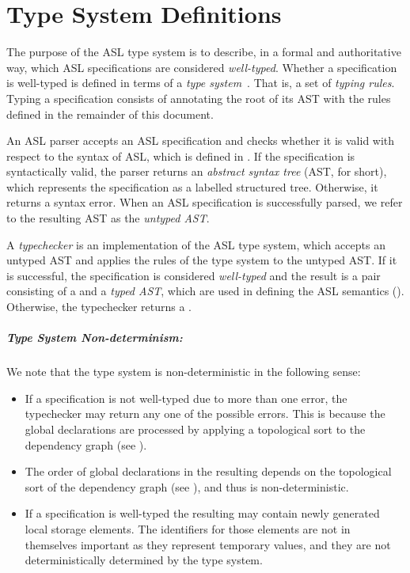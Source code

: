 \chapter{Type System Definitions\label{chap:TypeChecking}}

The purpose of the ASL type system is to describe, in a formal and authoritative way,
which ASL specifications are considered \emph{well-typed}.
Whether a specification is well-typed is defined in terms of a \emph{type system}~\cite{TypeSystemsLucaCardelli}.
That is, a set of \emph{typing rules}.
Typing a specification consists of annotating the root of its AST with the rules defined
in the remainder of this document.

An ASL parser accepts an ASL specification and checks whether it is valid with respect to the syntax of ASL,
which is defined in .
If the specification is syntactically valid, the parser returns an \emph{abstract syntax tree} (AST, for short),
which represents the specification as a labelled structured tree. Otherwise, it returns a syntax error.
When an ASL specification is successfully parsed, we refer to the resulting AST as the \emph{untyped AST}.

A \emph{typechecker} is an implementation of the ASL type system, which accepts an untyped AST and applies the
rules of the type system to the untyped AST. If it is successful, the specification
is considered \emph{well-typed} and the result is a pair consisting of
a \emph{\staticenvironmentterm{}} and a \emph{typed AST},
which are used in defining the ASL semantics ().
Otherwise, the typechecker returns a \typingerrorterm{}.

\paragraph{Type System Non-determinism:}
We note that the type system is non-deterministic in the following sense:
\begin{itemize}
  \item If a specification is not well-typed due to more than one error, the typechecker
        may return any one of the possible errors. This is because the global declarations
        are processed by applying a topological sort to the dependency graph (see ).
  \item The order of global declarations in the resulting \typedast{} depends on the topological sort
        of the dependency graph (see ), and thus is non-deterministic.
  \item If a specification is well-typed the resulting \typedast{} may contain
        newly generated local storage elements. The identifiers for those elements
        are not in themselves important as they represent temporary values,
        and they are not deterministically determined by the type system.
\end{itemize}


